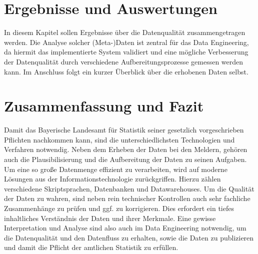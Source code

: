 \section{Ergebnisse und Auswertungen}

In diesem Kapitel sollen Ergebnisse über die Datenqualität zusammengetragen werden. Die Analyse solcher (Meta-)Daten ist zentral für das Data Engineering, da hiermit das implementierte System validiert und eine mögliche Verbesserung der Datenqualität durch verschiedene Aufbereitungsprozesse gemessen werden kann. Im Anschluss folgt ein kurzer Überblick über die erhobenen Daten selbst.



\section{Zusammenfassung und Fazit}

Damit das Bayerische Landesamt für Statistik seiner gesetzlich vorgeschrieben Pflichten nachkommen kann, sind die unterschiedlichsten Technologien und Verfahren notwendig. Neben dem Erheben der Daten bei den Meldern, gehören auch die Plausibilisierung und die Aufbereitung der Daten zu seinen Aufgaben. Um eine so große Datenmenge effizient zu verarbeiten, wird auf moderne Lösungen aus der Informationstechnologie zurückgriffen. Hierzu zählen verschiedene Skriptsprachen, Datenbanken und Datawarehouses. Um die Qualität der Daten zu wahren, sind neben rein technischer Kontrollen auch sehr fachliche Zusammenhänge zu prüfen und ggf. zu korrigieren. Dies erfordert ein tiefes inhaltliches Verständnis der Daten und ihrer Merkmale. Eine gewisse Interpretation und Analyse sind also auch im Data Engineering notwendig, um die Datenqualität und den Datenfluss zu erhalten, sowie die Daten zu publizieren und damit die Pflicht der amtlichen Statistik zu erfüllen. 


\newpage%

%



